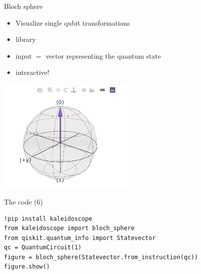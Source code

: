 \begin{frame}{Bloch sphere}
\begin{itemize}
    \item<1-> Visualize single qubit transformations
    \item<2->  library
    \item<3-> input \(=\) vector representing the quantum state
    \item<4-> interactive!
\end{itemize}

\begin{center}
    \includegraphics[width=0.5\textwidth]{img/lec1/bloch_sphere.png}
\end{center}
\end{frame}

\begin{frame}[fragile]{The code (6)}
\begin{verbatim}
!pip install kaleidoscope
from kaleidoscope import bloch_sphere
from qiskit.quantum_info import Statevector
qc = QuantumCircuit(1)
figure = bloch_sphere(Statevector.from_instruction(qc))
figure.show()
\end{verbatim}
\end{frame}

